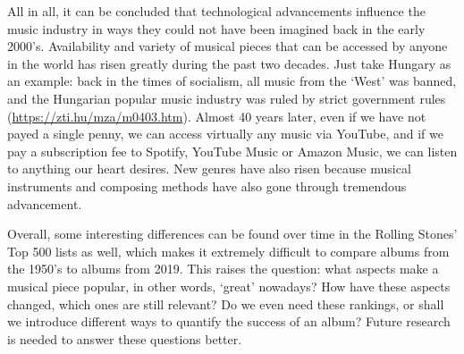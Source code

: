 \documentclass[
]{article}
\begin{document}
All in all, it can be concluded that technological advancements
influence the music industry in ways they could not have been imagined
back in the early 2000's. Availability and variety of musical pieces
that can be accessed by anyone in the world has risen greatly during the
past two decades. Just take Hungary as an example: back in the times of
socialism, all music from the `West' was banned, and the Hungarian
popular music industry was ruled by strict government rules
(\url{https://zti.hu/mza/m0403.htm}). Almost 40 years later, even if we
have not payed a single penny, we can access virtually any music via
YouTube, and if we pay a subscription fee to Spotify, YouTube Music or
Amazon Music, we can listen to anything our heart desires. New genres
have also risen because musical instruments and composing methods have
also gone through tremendous advancement.

Overall, some interesting differences can be found over time in the
Rolling Stones' Top 500 lists as well, which makes it extremely
difficult to compare albums from the 1950's to albums from 2019. This
raises the question: what aspects make a musical piece popular, in other
words, `great' nowadays? How have these aspects changed, which ones are
still relevant? Do we even need these rankings, or shall we introduce
different ways to quantify the success of an album? Future research is
needed to answer these questions better.
\end{document}
